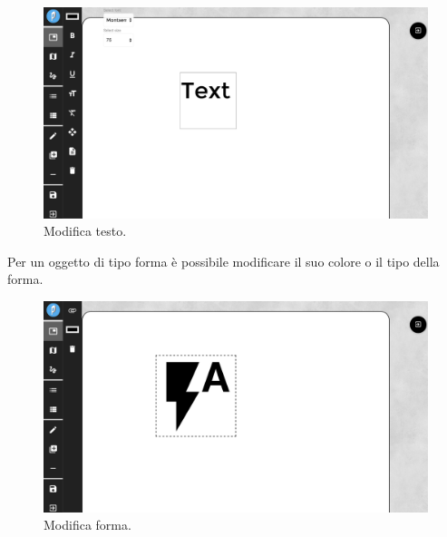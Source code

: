 \begin{figure}[!h]
\begin{center}
\includegraphics[scale=0.35]{img/toolbar_text.png}
\caption{Modifica testo.}
\end{center}
\end{figure}
\newpage
Per un oggetto di tipo forma è possibile modificare il suo colore o il tipo della forma.\\
\begin{figure}[!h]
\begin{center}
\includegraphics[scale=0.35]{img/edit_shape.png}
\caption{Modifica forma.}
\end{center}
\end{figure}

\newpage
